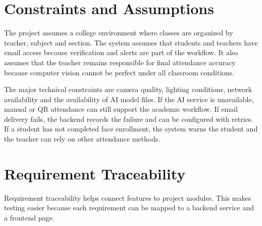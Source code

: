 \section{Constraints and Assumptions}

The project assumes a college environment where classes are organized by teacher, subject and section. The system assumes that students and teachers have email access because verification and alerts are part of the workflow. It also assumes that the teacher remains responsible for final attendance accuracy because computer vision cannot be perfect under all classroom conditions.

The major technical constraints are camera quality, lighting conditions, network availability and the availability of AI model files. If the AI service is unavailable, manual or QR attendance can still support the academic workflow. If email delivery fails, the backend records the failure and can be configured with retries. If a student has not completed face enrollment, the system warns the student and the teacher can rely on other attendance methods.

\section{Requirement Traceability}

Requirement traceability helps connect features to project modules. This makes testing easier because each requirement can be mapped to a backend service and a frontend page.

